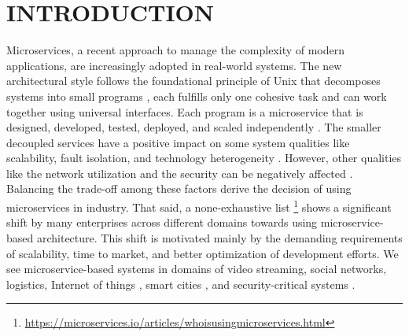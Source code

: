 \section{INTRODUCTION}

Microservices, a recent approach to manage the complexity of modern applications, are increasingly adopted in real-world systems. The new architectural style follows the foundational principle of Unix that decomposes systems into small programs \cite{wolff2016microservices}, each fulfills only one cohesive task and can work together using universal interfaces. Each program is a microservice that is designed, developed, tested,  deployed, and scaled independently \cite{microservicesfrowler}. The smaller decoupled services have a positive impact on some system qualities like scalability, fault isolation, and technology heterogeneity \cite{newman2015building}. However, other qualities like the network utilization and the security can be negatively affected \cite{ahmadvand2016requirements}.  Balancing the trade-off among these factors derive the decision of using microservices in industry. That said, a none-exhaustive list \footnote{\url{https://microservices.io/articles/whoisusingmicroservices.html}} shows a significant shift by many enterprises across different domains towards using microservice-based architecture. This shift is motivated mainly by the demanding requirements of scalability, time to market, and better optimization of development efforts. We see microservice-based systems in domains of video streaming, social networks, logistics, Internet of things \cite{butzin2016microservices}, smart cities \cite{krylovskiy2015designing}, and security-critical systems \cite{fetzer2016building}. 

